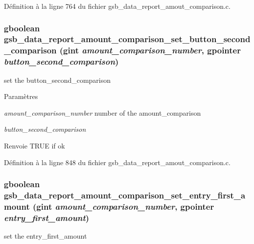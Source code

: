 Définition à la ligne 764 du fichier gsb\_\-data\_\-report\_\-amout\_\-comparison.c.

\subsubsection[{gsb\_\-data\_\-report\_\-amount\_\-comparison\_\-set\_\-button\_\-second\_\-comparison}]{\setlength{\rightskip}{0pt plus 5cm}gboolean gsb\_\-data\_\-report\_\-amount\_\-comparison\_\-set\_\-button\_\-second\_\-comparison (gint {\em amount\_\-comparison\_\-number}, \/  gpointer {\em button\_\-second\_\-comparison})}\label{gsb__data__report__amout__comparison_8h_a050001ae227cac61e5e2bdde14f9503d}
set the button\_\-second\_\-comparison


\begin{DoxyParams}{Paramètres}
\item[{\em amount\_\-comparison\_\-number}]number of the amount\_\-comparison \item[{\em button\_\-second\_\-comparison}]\end{DoxyParams}
\begin{DoxyReturn}{Renvoie}
TRUE if ok 
\end{DoxyReturn}


Définition à la ligne 848 du fichier gsb\_\-data\_\-report\_\-amout\_\-comparison.c.

\subsubsection[{gsb\_\-data\_\-report\_\-amount\_\-comparison\_\-set\_\-entry\_\-first\_\-amount}]{\setlength{\rightskip}{0pt plus 5cm}gboolean gsb\_\-data\_\-report\_\-amount\_\-comparison\_\-set\_\-entry\_\-first\_\-amount (gint {\em amount\_\-comparison\_\-number}, \/  gpointer {\em entry\_\-first\_\-amount})}\label{gsb__data__report__amout__comparison_8h_aa2ae38c4595b77ebea8e9f74cb618298}
set the entry\_\-first\_\-amount


